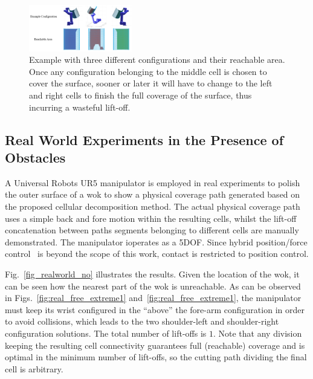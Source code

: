 \documentclass[journal]{IEEEtran}
\begin{document}
\begin{figure}[htb]
\centering
\includegraphics[width = 0.4\textwidth]{exp_pipe/three_example_pose}
\caption{Example with three different configurations and their reachable area. Once any configuration belonging to the middle cell is chosen to cover the surface, sooner or later it will have to change to the left and right cells to finish the full coverage of the surface, thus incurring a wasteful lift-off.}
\label{figthreeexamplepose}
\end{figure}

\subsection{Real World Experiments in the Presence of Obstacles}
A Universal Robots UR5 manipulator is employed in real experiments to polish the outer surface of a wok to show a physical coverage path generated based on the proposed cellular decomposition method. 
The actual physical coverage path uses a simple back and fore motion within the resulting cells, whilst the lift-off concatenation between paths segments belonging to different cells are manually demonstrated. 
The manipulator ioperates as a 5DOF. %
Since hybrid position/force control~\cite{solanes2019robust} is beyond the scope of this work, contact is restricted to position control. 

Fig.~\ref{fig_realworld_no} illustrates the results. Given the location of the wok, it can be seen how the nearest %
part of the wok is unreachable. 
As can be observed in Figs.~\ref{fig:real_free_extreme1} and~\ref{fig:real_free_extreme1}, 
the manipulator must keep its wrist configured in the ``above'' the fore-arm configuration in order to 
avoid collisions, which leads to the two shoulder-left and shoulder-right configuration solutions. 
The total number of lift-offs is $1$. 
Note that any division keeping the resulting cell connectivity guarantees full (reachable) coverage and is optimal in the minimum number of lift-offs, so the cutting path dividing the final cell is arbitrary. 
\end{document}

